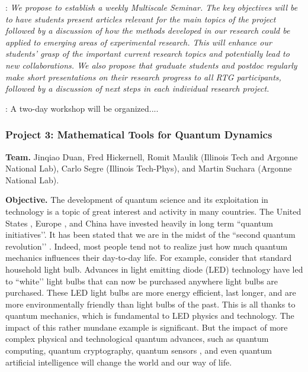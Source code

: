 \documentclass[11pt]{article}
\begin{document}
: \emph{We propose to establish a weekly Multiscale Seminar. The key objectives will be to have students present articles relevant for the main topics of the project followed by a discussion of how the methods developed in our research could be applied to emerging areas of experimental research. This will enhance our students’ grasp of the important current research topics and potentially lead to new collaborations. We also propose that graduate students and postdoc regularly make short presentations on their research progress to all RTG participants, followed by a discussion of next steps in each individual research project.}

:  A two-day workshop will be organized....




\subsubsection*{Project 3: Mathematical Tools for Quantum Dynamics}
\noindent
{\bf Team.}  Jinqiao Duan, Fred Hickernell, Romit Maulik (Illinois Tech and Argonne National Lab), Carlo Segre (Illinois Tech-Phys), and Martin Suchara (Argonne National Lab).
\medskip

\noindent
{\bf Objective.} The development of quantum science and its exploitation in technology is a topic of great interest and activity in many countries. The United States \cite{raymer2019us}, Europe \cite{riedel2019europe}, and China \cite{kania2018quantum} have invested heavily in long term ``quantum initiatives’’.  It has been stated that we are in the midst of the ``second quantum revolution’’ \cite{kania2018quantum}. Indeed,  most people tend not to realize just how much quantum mechanics influences their day-to-day life. For example, consider that standard household light bulb. Advances in light emitting diode (LED) technology have led to ``white’’ light bulbs that can now be purchased anywhere light bulbs are purchased. These LED light bulbs are more energy efficient, last longer, and are more environmentally friendly than light bulbs of the past. This is all thanks to quantum mechanics, which is fundamental to LED physics and technology. The impact of this rather mundane example is significant. But the impact of more complex physical and technological quantum advances, such as quantum computing, quantum cryptography, quantum sensors \cite{ng2020guest}, and even quantum artificial intelligence \cite{taylor2020quantum} will change the world and our way of life.
\end{document}

